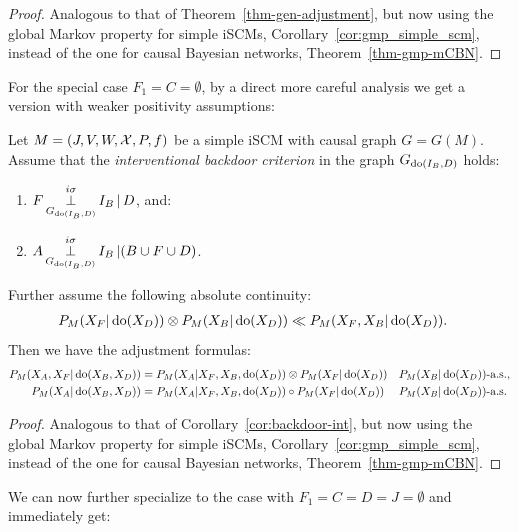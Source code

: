 \begin{proof}
  Analogous to that of Theorem~\ref{thm-gen-adjustment}, but now using
  the global Markov property for simple iSCMs, Corollary~\ref{cor:gmp_simple_scm}, 
  instead of the one for causal Bayesian networks, Theorem~\ref{thm-gmp-mCBN}. 
\end{proof}

For the special case $F_1 = C = \emptyset$, by a direct more careful analysis we get a version with weaker positivity assumptions:
\begin{Thm}\label{thm:backdoor-int-scms}
  Let $M = \left ( J, V, W, \mathcal{X}, P, f \right )$ be a simple iSCM with causal graph $G = G(M)$. %
  Assume that the \emph{interventional backdoor criterion} in the graph $G_{\operatorname{do}(I_B,D)}$ holds:
  \begin{enumerate}
    \item $\displaystyle F \operatorname*{\perp}^{i\sigma}_{G_{\operatorname{do}(I_B,D)}} I_B  \operatorname*{|} D$, and:
    \item $\displaystyle A \operatorname*{\perp}^{i\sigma}_{G_{\operatorname{do}(I_B,D)}} I_B  \operatorname*{|} (B \cup F \cup D)$.
  \end{enumerate}
  Further assume the following absolute continuity:
  \begin{align*}
      P_M(X_F|\operatorname{do}(X_D)) \otimes P_M(X_B|\operatorname{do}(X_D)) &\ll  P_M(X_F,X_B|\operatorname{do}(X_D)).
  \end{align*}
  Then we have the adjustment formulas: 
  \begin{align*}
    P_M(X_A,X_F|\operatorname{do}(X_B,X_D)) &= P_M(X_A|X_F,X_B,\operatorname{do}(X_D)) \otimes P_M(X_F|\operatorname{do}(X_D)) && P_M(X_B|\operatorname{do}(X_D))\text{-a.s.}, \\
    P_M(X_A|\operatorname{do}(X_B,X_D)) &= P_M(X_A|X_F,X_B,\operatorname{do}(X_D)) \circ P_M(X_F|\operatorname{do}(X_D)) && P_M(X_B|\operatorname{do}(X_D))\text{-a.s.}
  \end{align*}
\end{Thm}
\begin{proof}
  Analogous to that of Corollary~\ref{cor:backdoor-int}, but now using
  the global Markov property for simple iSCMs, Corollary~\ref{cor:gmp_simple_scm}, 
  instead of the one for causal Bayesian networks, Theorem~\ref{thm-gmp-mCBN}. 
\end{proof}
We can now further specialize to the case with $F_1=C=D=J= \emptyset$ and immediately get:

